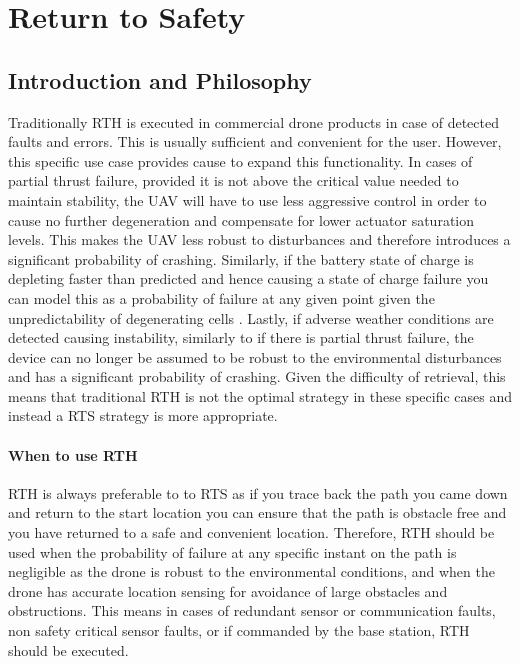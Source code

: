 \newpage
{}
\section{Return to Safety} \label{Return to Safety}


\subsection{Introduction and Philosophy}
Traditionally \gls{RTH} is executed in commercial drone products in case of detected faults and errors. This is usually sufficient and convenient for the user. However, this specific use case provides cause to expand this functionality. In cases of partial thrust failure, provided it is not above the critical value needed to maintain stability, the \gls{UAV} will have to use less aggressive control in order to cause no further degeneration and compensate for lower actuator saturation levels. This makes the \gls{UAV} less robust to disturbances and therefore introduces a significant probability of crashing. Similarly, if the battery state of charge is depleting faster than predicted and hence causing a state of charge failure you can model this as a probability of failure at any given point given the unpredictability of degenerating cells \cite{cell stuff}. Lastly, if adverse weather conditions are detected causing instability, similarly to if there is partial thrust failure, the device can no longer be assumed to be robust to the environmental disturbances and has a significant probability of crashing. Given the difficulty of retrieval, this means that traditional \gls{RTH} is not the optimal strategy in these specific cases and instead a \gls{RTS} strategy is more appropriate.

\paragraph{When to use \gls{RTH}}
\gls{RTH} is always preferable to to \gls{RTS} as if you trace back the path you came down and return to the start location you can ensure that the path is obstacle free and you have returned to a safe and convenient location. Therefore, \gls{RTH} should be used when the probability of failure at any specific instant on the path is negligible as the drone is robust to the environmental conditions, and when the drone has accurate location sensing for avoidance of large obstacles and obstructions. This means in cases of redundant sensor or communication faults, non safety critical sensor faults, or if commanded by the base station, \gls{RTH} should be executed.

